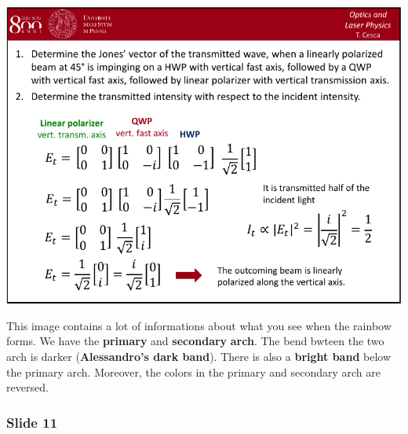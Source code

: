 \documentclass[../main/main.tex]{subfiles}
\begin{document}
\begin{minipage}[]{0.5\linewidth}
\centering
\includegraphics[page=10,width=1\textwidth]{../lessons/pdf_file/04_lecture.pdf}
\end{minipage}
\hspace{0.3cm}\vspace{0.3cm}
\begin{minipage}[c]{0.47\linewidth}

This image contains a lot of informations about what you see when the rainbow forms. We have the \textbf{primary} and \textbf{secondary} \textbf{arch}. The bend bwteen the two arch is darker (\textbf{Alessandro's dark band}). There is also a \textbf{bright band} below the primary arch. Moreover, the colors in the primary and secondary arch are reversed.


\end{minipage}

\subsubsection*{Slide 11}
\end{document}
